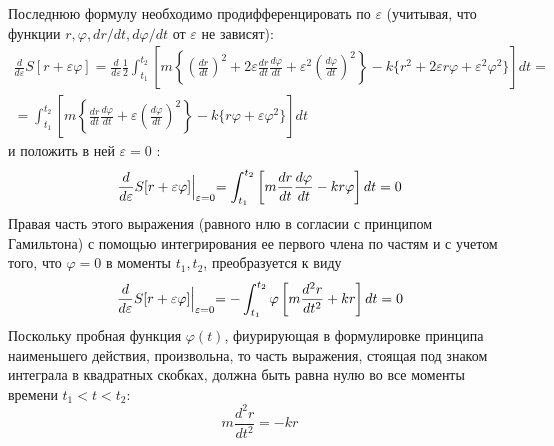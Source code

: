 \documentclass[12pt,a4paper]{article}
\begin{document}
	Последнюю формулу необходимо продифференцировать по $\varepsilon$ (учитывая, что функции $r, \varphi, dr/dt, d\varphi/dt$ от $\varepsilon$ не зависят):\\
	\begin{eqnarray}
	\frac{d}{d\varepsilon}S[r+\varepsilon\varphi] = \frac{d}{d\varepsilon} \frac{1}{2}  \int_{t_1}^{t_2}\left[m\left\{(\frac{dr}{dt})^2 + 2\varepsilon\frac{dr}{dt}\frac{d\varphi}{dt} + \varepsilon^2(\frac{d\varphi}{dt})^2\right\} - k\{r^2 + 2\varepsilon r\varphi + \varepsilon^2\varphi^2\}\right]dt = \nonumber \\
	 = \int_{t_1}^{t_2}\left[m\left\{\frac{dr}{dt}\frac{d\varphi}{dt} + \varepsilon(\frac{d\varphi}{dt} )^2 \right\} - k\{r\varphi+\varepsilon\varphi^2\} \right] dt
	\end{eqnarray}
	и положить в ней $\varepsilon = 0$ :\\
	\begin{equation*}
	\frac{d}{d\varepsilon}S[r+\varepsilon\varphi]\Bigl|_{\varepsilon=0} = \int_{t_1}^{t_2}\left[m\frac{dr}{dt}\frac{d\varphi}{dt} -kr\varphi\right] dt = 0
	\end{equation*}
	Правая часть этого выражения (равного нлю в согласии с принципом Гамильтона) с помощью интегрирования ее первого члена по частям и с учетом того, что $\varphi=0$ в моменты $t_1, t_2$, преобразуется к виду \\
	\begin{equation*}
	\frac{d}{d\varepsilon}S[r+\varepsilon\varphi]\Bigl|_{\varepsilon=0} = -\int_{t_1}^{t_2}\varphi\left[m\frac{d^2r}{dt^2} +kr\right] dt = 0
	\end{equation*}
	Поскольку пробная функция $\varphi(t)$, фиурирующая в формулировке принципа наименьшего действия, произвольна, то часть выражения, стоящая под знаком интеграла в квадратных скобках, должна быть равна нулю  во все моменты времени $t_1 < t < t_2$:\\
	\begin{equation*}
	m\frac{d^2r}{dt^2} = -kr
	\end{equation*}
\end{document}
